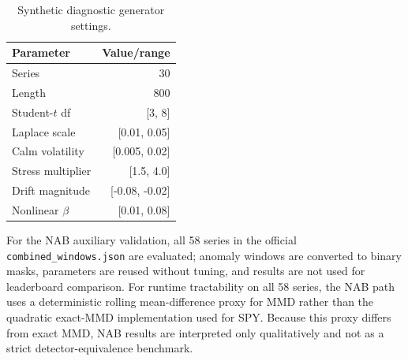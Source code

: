 \documentclass[pdflatex,sn-mathphys-num]{sn-jnl}
\begin{document}
\begin{appendices}
\begin{table}[t]
\centering
\caption{Synthetic diagnostic generator settings.}
\label{tab:synthetic_params}
\scriptsize
\begin{tabular}{lr}
\toprule
Parameter & Value/range\\
\midrule
Series & 30\\
Length & 800\\
Student-$t$ df & [3, 8]\\
Laplace scale & [0.01, 0.05]\\
Calm volatility & [0.005, 0.02]\\
Stress multiplier & [1.5, 4.0]\\
Drift magnitude & [-0.08, -0.02]\\
Nonlinear $\beta$ & [0.01, 0.08]\\
\bottomrule
\end{tabular}
\end{table}

For the NAB auxiliary validation, all 58 series in the official \texttt{combined\_windows.json} are evaluated; anomaly windows are converted to binary masks, parameters are reused without tuning, and results are not used for leaderboard comparison. For runtime tractability on all 58 series, the NAB path uses a deterministic rolling mean-difference proxy for MMD rather than the quadratic exact-MMD implementation used for SPY. Because this proxy differs from exact MMD, NAB results are interpreted only qualitatively and not as a strict detector-equivalence benchmark.

\end{appendices}
\end{document}
